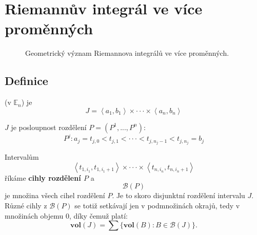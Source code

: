 \documentclass[../main.tex]{subfiles}
\begin{document}
\section{Riemannův integrál ve více proměnných}

\begin{figure}[h]
	\centering
	\hspace{4em}
	\caption{Geometrický význam Riemannova integrálů ve více proměnných.}
\end{figure}

\subsection{Definice}

\begin{definitionnodot}
	 (v $\mathbb{E}_n$) je 
	\[J = \left<a_1,b_1\right> \times \cdot \cdot \cdot \times \left<a_n,b_n\right>\]
\end{definitionnodot}

\begin{definitionnodot}
	$J$ je posloupnost rozdělení $P = (P^1,...,P^n)$:
	\[P^j : a_j = t_{j,0} < t_{j,1} < \cdot \cdot \cdot < t_{j,n_j-1} < t_{j,n_j} = b_j\]
\end{definitionnodot}

\begin{definition}[Cihly]
	Intervalům
	\[\left<t_{1,i_1},t_{1,i_1+1}\right> \times \cdot \cdot \cdot \times \left<t_{n,i_n},t_{n,i_n+1}\right>\]
	říkáme \textbf{cihly rozdělení $P$} a $$\mathcal{B}(P)$$ je množina všech cihel rozdělení $P$. Je to skoro disjunktní rozdělení intervalu $J$.
	Různé cihly z $\mathcal{B}(P)$ se totiž setkávají jen v podmnožinách okrajů, tedy v množinách objemu 0, díky čemuž platí:
	\[\textbf{vol}(J) = \sum \{\textbf{vol}(B) : B \in \mathcal{B}(J)\}.\]
\end{definition}
\end{document}
